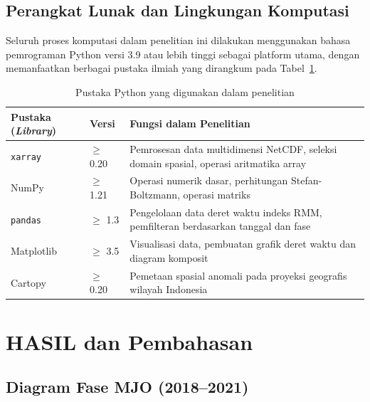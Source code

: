 \documentclass[12pt,a4paper]{report}
\begin{document}
\section{Perangkat Lunak dan Lingkungan Komputasi}

Seluruh proses komputasi dalam penelitian ini dilakukan menggunakan bahasa
pemrograman Python versi 3.9 atau lebih tinggi sebagai platform utama, dengan
memanfaatkan berbagai pustaka ilmiah yang dirangkum pada
Tabel~\ref{tab:python_libs}.

\begin{table}[htbp]
  \centering
  \caption{Pustaka Python yang digunakan dalam penelitian}
  \label{tab:python_libs}
  \begin{tabularx}{\textwidth}{
    >{\raggedright\arraybackslash}p{2.8cm}
    >{\centering\arraybackslash}p{1.6cm}
    >{\raggedright\arraybackslash}X}
    \toprule
    \textbf{Pustaka (\textit{Library})} & \textbf{Versi} &
    \textbf{Fungsi dalam Penelitian} \\
    \midrule
    \texttt{xarray}     & $\geq$ 0.20 &
      Pemrosesan data multidimensi NetCDF, seleksi domain spasial,
      operasi aritmatika array \\
    NumPy               & $\geq$ 1.21 &
      Operasi numerik dasar, perhitungan Stefan-Boltzmann, operasi matriks \\
    \texttt{pandas}     & $\geq$ 1.3  &
      Pengelolaan data deret waktu indeks RMM, pemfilteran berdasarkan
      tanggal dan fase \\
    Matplotlib          & $\geq$ 3.5  &
      Visualisasi data, pembuatan grafik deret waktu dan diagram komposit \\
    Cartopy             & $\geq$ 0.20 &
      Pemetaan spasial anomali pada proyeksi geografis wilayah Indonesia \\
    \bottomrule
  \end{tabularx}
\end{table}


\chapter{HASIL dan Pembahasan}

\section{Diagram Fase MJO (2018--2021)}
 
\end{document}

